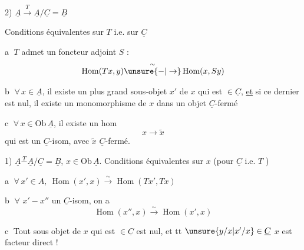 2) $\underline A\xrightarrow{T}\underline A/\underline C=\underline B$

Conditions équivalentes sur $T$ i.e. sur $\underline C$

\textcircled{a} $T$ admet un foncteur adjoint $S$ :
\[
\operatorname{Hom}(Tx,y)\overset{\sim}{\unsure{\mathord{-}|\to}}\operatorname{Hom}(x,Sy)
\]

\textcircled{b} $\forall\, x\in\underline A$, il existe un plus grand sous-objet $x'$ de $x$ qui est $\in\underline C$, \uline{et} si ce dernier est nul, il existe un monomorphisme de $x$ dans un objet $\underline C$-fermé

\textcircled{c} $\forall\,x\in\mathrm{Ob}\,\underline A$, il existe un hom
\[
x\longrightarrow\tilde x
\]
qui est un $\underline C$-isom, avec $\tilde x$ $\underline C$-fermé.


1) $\underline A\overset{T}{-}\underline A/\underline C=\underline B$, $x\in\mathrm{Ob}\,\underline A$. Conditions équivalentes sur $x$ (pour $\underline C$ i.e. $T$ )

\textcircled{a} $\forall\,x'\in A,\ \operatorname{Hom}(x',x)\xrightarrow{\sim}\operatorname{Hom}(Tx',Tx)$

\textcircled{b} $\forall$ $x'-x''$ un $\underline C$-isom, on a
\[
\operatorname{Hom}(x'',x)\xrightarrow{\sim}\operatorname{Hom}(x',x)
\]


\textcircled{c} Tout sous objet de $x$ qui est $\in\underline C$ est nul, et  tt   $\unsure{y/x|x'/x}\in\underline C$  $x$ est facteur direct !

